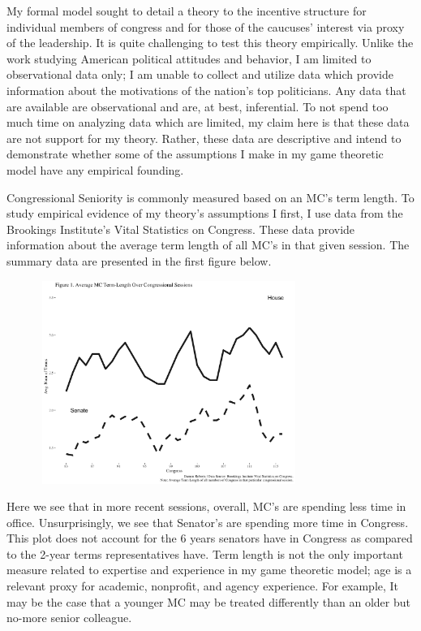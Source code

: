 \documentclass [12pt]{article}
\begin{document}
{{My formal model sought to detail a theory to the incentive structure for individual members of congress and for those of the caucuses' interest via proxy of the leadership. It is quite challenging to test this theory empirically. Unlike the work studying American political attitudes and behavior, I am limited to observational data only; I am unable to collect and utilize data which provide information about the motivations of the nation's top politicians. Any data that are available are observational and are, at best, inferential. To not spend too much time on analyzing data which are limited, my claim here is that these data are not support for my theory. Rather, these data are descriptive and intend to demonstrate whether some of the assumptions I make in my game theoretic model have any empirical founding.

Congressional Seniority is commonly measured based on an MC's term length. To study empirical evidence of my theory's assumptions I first, I use data from the Brookings Institute's Vital Statistics on Congress. These data provide information about the average term length of all MC's in that given session. The summary data are presented in the first figure below.

\includegraphics[height=250, width=400]{../figures/term-time-plot.png}

Here we see that in more recent sessions, overall, MC's are spending less time in office. Unsurprisingly, we see that Senator's are spending more time in Congress. This plot does not account for the 6 years senators have in Congress as compared to the 2-year terms representatives have. Term length is not the only important measure related to expertise and experience in my game theoretic model; age is a relevant proxy for academic, nonprofit, and agency experience. For example, It may be the case that a younger MC may be treated differently than an older but no-more senior colleague. 

}}
\end{document}
